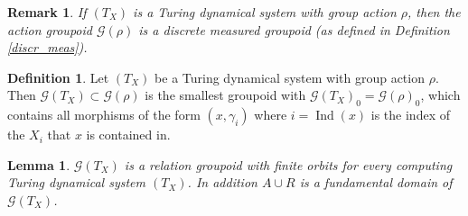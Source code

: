 \documentclass[12pt,a4paper]{scrartcl}
\theoremstyle{plain}
\newtheorem{Lemma}[Theorem]{Lemma}
\newtheorem{Remark}[Theorem]{Remark}
\theoremstyle{definition}
\newtheorem{Definition}[Theorem]{Definition}
\newcommand{\2}{\mathbb{Z} / 2 \mathbb{Z}}
\newcommand{\G}{\mathcal{G}}
\newcommand{\1}{\bar{1}}
\newcommand{\0}{\bar{0}}
\newcommand{\Ind}{\operatorname{Ind}}
\begin{document}
\begin{Remark}
	If $(T_X)$ is a Turing dynamical system with group action $\rho$, then the action groupoid $\G(\rho)$ is a discrete measured groupoid (as defined in Definition \ref{discr_meas}).
\end{Remark}
\begin{Definition}
	Let $(T_X)$ be a Turing dynamical system with group action $\rho$. Then $\G (T_X) \subset \G(\rho)$ is the smallest groupoid with $\G (T_X)_0 = \G(\rho)_0$, which contains all morphisms of the form $(x, \gamma_i)$ where $i = \Ind(x)$ is the index of the $X_i$ that $x$ is contained in.
\end{Definition}
\begin{Lemma} \label{TX_rel_groupoid}
	$\G (T_X)$ is a relation groupoid with finite orbits for every computing Turing dynamical system $(T_X)$. In addition $A \cup R$ is a fundamental domain of $\G (T_X)$.
\end{Lemma}
\end{document}
